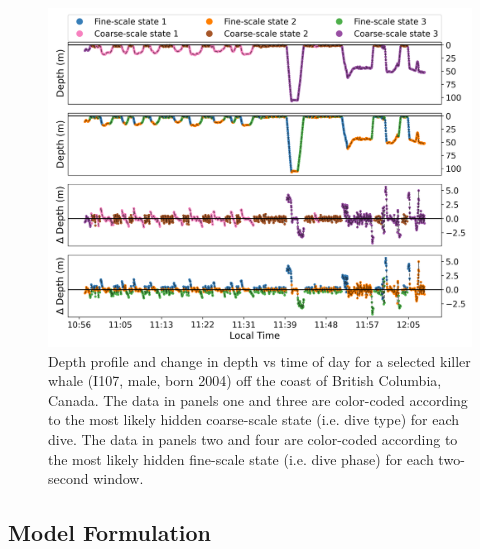 \begin{figure}%
    \centering
    \includegraphics[width=5.5in]{../plt/decoded_dives_kw_I107_K_3_3_nWhales_8.png}
    \caption{Depth profile and change in depth vs time of day for a selected killer whale (I107, male, born 2004) off the coast of British Columbia, Canada. The data in panels one and three are color-coded according to the most likely hidden coarse-scale state (i.e. dive type) for each dive. The data in panels two and four are color-coded according to the most likely hidden fine-scale state (i.e. dive phase) for each two-second window.}
    \label{fig:data}
\end{figure}
%
\subsection{Model Formulation}


